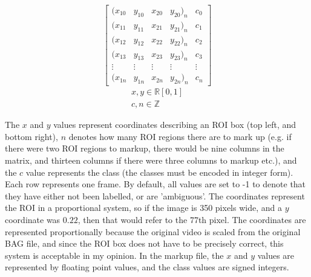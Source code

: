     \[
    \begin{bmatrix}
    (x_{10} & y_{10} & x_{20} & y_{20})_n & c_{0} \\
    (x_{11} & y_{11} & x_{21} & y_{21})_n & c_{1} \\
    (x_{12} & y_{12} & x_{22} & y_{22})_n & c_{2} \\
    (x_{13} & y_{13} & x_{23} & y_{23})_n & c_{3} \\
     \vdots & \vdots & \vdots & \vdots    & \vdots\\
    (x_{1n} & y_{1n} & x_{2n} & y_{2n})_n & c_{n} 
    \end{bmatrix}
    \]
    \begin{gather*}
    x, y \in \mathbb{R} [0, 1]\\
    c, n \in \mathbb{Z}
    \end{gather*}

    The $x$ and $y$ values represent coordinates describing an ROI box (top left, and bottom right), $n$ denotes how many ROI regions there are  to mark up (e.g. if there were two ROI regions to markup, there would be nine columns in the matrix, and thirteen columns if there were three columns to markup etc.), and the $c$ value represents the class (the classes must be encoded in integer form). Each row represents one frame. By default, all values are set to -1 to denote that they have either not been labelled, or are 'ambiguous'. The coordinates represent the ROI in a proportional system, so if the image is 350 pixels wide, and a $y$ coordinate was $0.22$, then that would refer to the 77th pixel. The coordinates are represented proportionally because the original video is scaled from the original BAG file, and since the ROI box does not have to be precisely correct, this system is acceptable in my opinion. In the markup file, the $x$ and $y$ values are represented by floating point values, and the class values are signed integers.

